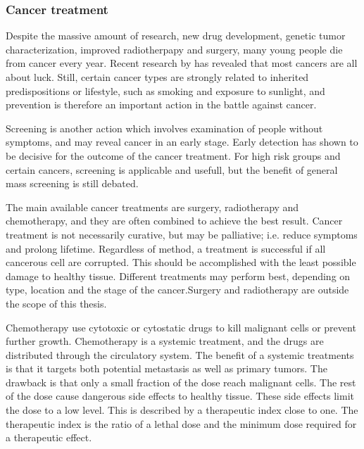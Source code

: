 \subsubsection{Cancer treatment}

Despite the massive amount of research, new drug development, genetic tumor characterization, improved radiotherpapy and surgery, many young people die from cancer every year. Recent research by \citet{Tomasetti2014} has revealed that most cancers are all about luck. Still, certain cancer types are strongly related to inherited predispositions or  lifestyle, such as smoking and exposure to sunlight, and prevention is therefore an important action in the battle against cancer.  

Screening is another action which involves examination of people without symptoms, and may reveal cancer in an early stage.  Early detection has shown to be decisive for the outcome of the cancer treatment\cite{king2006cancer}\cite{Jordan1986}. For high risk groups and certain cancers,  screening is applicable and usefull, but the benefit of general mass screening is still debated. 

The main available cancer treatments are surgery, radiotherapy and chemotherapy, and they are often combined to achieve the best result. Cancer treatment is not necessarily curative, but may be palliative; i.e. reduce symptoms and prolong lifetime. Regardless of method, a treatment is successful if all cancerous cell are corrupted. This should be accomplished with the least possible damage to healthy tissue. Different treatments may perform best, depending on type, location and the stage of the cancer.Surgery and radiotherapy are outside the scope of this thesis.

Chemotherapy use cytotoxic or cytostatic drugs to kill malignant cells or prevent further growth\cite{Skeel2011}. Chemotherapy is a systemic treatment, and the drugs are distributed through the circulatory system. The benefit of a systemic treatments is that it targets both potential metastasis as well as primary tumors. The drawback is that only a small fraction of the dose reach malignant cells. The rest of the dose cause dangerous side effects to healthy tissue\cite{doi:10.1056/NEJM200106283442607}. These side effects limit the dose to a low level. This is described by a therapeutic index close to one. The therapeutic index is the ratio of a lethal dose and the minimum dose required for a therapeutic effect.
 

